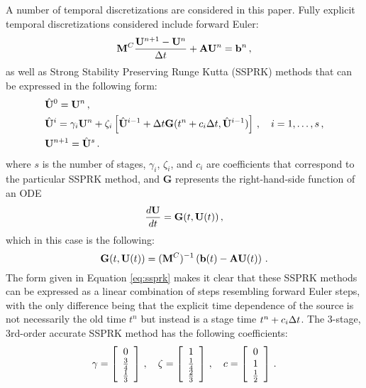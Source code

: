 A number of temporal discretizations are considered in this paper.
Fully explicit temporal discretizations considered include forward Euler:
\begin{equation}
  \mathbf{M}^C\frac{\mathbf{U}^{n+1}-\mathbf{U}^n}{\Delta t} + \mathbf{A}\mathbf{U}^n = \mathbf{b}^n \,,
\end{equation}
as well as Strong Stability Preserving Runge Kutta (SSPRK) methods that
can be expressed in the following form:
\begin{subequations}\label{eq:ssprk}
\begin{align}
  & \hat{\mathbf{U}}^0 = \mathbf{U}^n \,, \\
  & \hat{\mathbf{U}}^i = \gamma_i \mathbf{U}^n + \zeta_i \left[
      \hat{\mathbf{U}}^{i-1}
      + \Delta t\mathbf{G}(t^n+c_i\Delta t, \hat{\mathbf{U}}^{i-1})\right]
    \,, \quad
    i = 1,\ldots,s
    \,, \\
  & \mathbf{U}^{n+1} = \hat{\mathbf{U}}^s \,.
\end{align}
\end{subequations}
where $s$ is the number of stages, $\gamma_i$, $\zeta_i$, and $c_i$ are
coefficients that correspond to the particular SSPRK method, and
$\mathbf{G}$ represents the right-hand-side function of an ODE
\begin{equation}
  \frac{d\mathbf{U}}{dt} = \mathbf{G}(t,\mathbf{U}(t)) \,,
\end{equation}
which in this case is the following:
\begin{equation}
  \mathbf{G}(t,\mathbf{U}(t)) = (\mathbf{M}^C)^{-1}
    \left(\mathbf{b}(t) - \mathbf{A}\mathbf{U}(t)\right) \,.
\end{equation}
The form given in Equation \eqref{eq:ssprk} makes it clear that these
SSPRK methods can be expressed as a linear combination of steps resembling
forward Euler steps, with the only difference being that the explicit
time dependence of the source is not necessarily the old time $t^n$ but
instead is a stage time $t^n + c_i\Delta t$. The 3-stage, 3rd-order accurate SSPRK
method has the following coefficients:
\begin{equation}
  \gamma = \left[\begin{array}{c}
    0\\\frac{3}{4}\\\frac{1}{3}\end{array}\right]
  \,, \quad
  \zeta = \left[\begin{array}{c}
    1\\\frac{1}{4}\\\frac{2}{3}\end{array}\right]
  \,, \quad
  c = \left[\begin{array}{c}0\\1\\\frac{1}{2}\end{array}\right] \,.
\end{equation}
